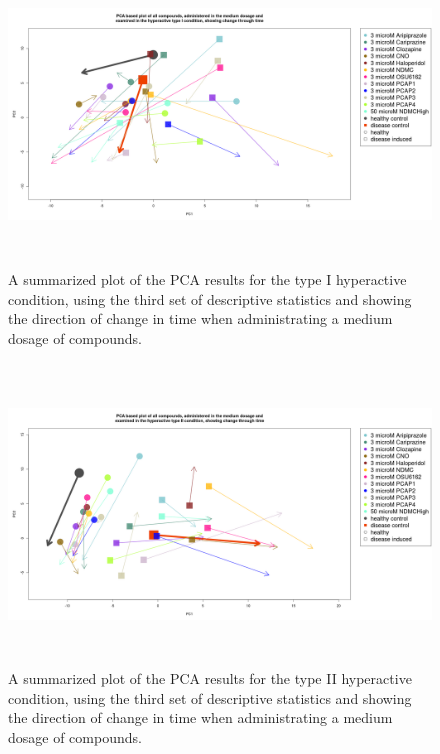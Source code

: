 \documentclass[a4paper,12pt]{article}
\begin{document}
\newpage
\begin{figure}[h!]
\begin{center}
\includegraphics[width=16cm,height=8cm]{All_together_3_microM_DarkApoHigh_in_time_set3.png}
\caption{A summarized plot of the PCA results for the type I hyperactive condition, using the third set of descriptive statistics and showing the direction of change in time when administrating a medium dosage of compounds.}
\end{center}
\end{figure}
\newpage
\begin{figure}[h!]
\begin{center}
\includegraphics[width=16cm,height=8cm]{All_together_3_microM_DarkPTZ_in_time_set3_NM.png}
\caption{A summarized plot of the PCA results for the type II hyperactive condition, using the third set of descriptive statistics and showing the direction of change in time when administrating a medium dosage of compounds.}
\end{center}
\end{figure}
\end{document}
